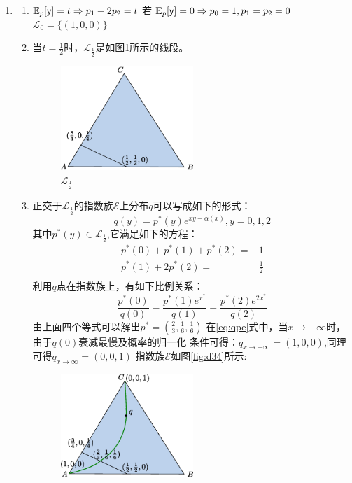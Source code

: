 \documentclass[a4paper]{article}
\begin{document}
\begin{enumerate}[label=\thehwcnt.\arabic*.]
\begin{enumerate}[label=(\alph*)]
   \end{enumerate}    
  \item 
  \begin{enumerate}[label=(\alph*)]
  \item $\operatorname{\mathbb{E}}_p[\mathsf{y}]=t \Rightarrow p_1+2p_2=t$
  若 $\operatorname{\mathbb{E}}_p[\mathsf{y}]=0 \Rightarrow p_0=1,p_1=p_2=0$
  $\mathcal{L}_0=\{(1,0,0)\}$
  \item 当$t=\frac{1}{2}$时，$\mathcal{L}_{\frac{1}{2}}$是如图\ref{fig:d12}所示的线段。
    \begin{figure}[!ht]
    \centering
    \includegraphics[width=5cm]{drawing.eps}
    \caption{$\mathcal{L}_{\frac{1}{2}}$}\label{fig:d12}
    \end{figure}
  \item 
  正交于$\mathcal{L}_{\frac{1}{2}}$的指数族$\mathcal{E}$上分布$q$可以写成如下的形式：
  \begin{equation}\label{eq:qpe}
        q(y)=p^*(y)e^{xy-\alpha(x)},y=0,1,2
  \end{equation}
  其中$p^*(y)\in \mathcal{L}_{\frac{1}{2}}$,它满足如下的方程：
  \begin{align}
   p^*(0)+p^*(1)+p^*(2)=& 1 \\
   p^*(1)+2p^*(2)=& \frac{1}{2} \\
  \end{align} 
  利用$q$点在指数族上，有如下比例关系：
  \[
   \frac{p^*(0)}{q(0)}=\frac{p^*(1)e^{x^*}}{q(1)}=\frac{p^*(2)e^{2x^*}}{q(2)}
  \]
  由上面四个等式可以解出$p^*=(\frac{2}{3},\frac{1}{6},\frac{1}{6})$
  在\eqref{eq:qpe}式中，当$x\to -\infty$时，由于$q(0)$衰减最慢及概率的归一化
  条件可得：$q_{x\to -\infty}=(1,0,0)$,同理可得$q_{x\to \infty}=(0,0,1)$
  指数族$\mathcal{E}$如图\ref{fig:d34}所示:
  \begin{figure}[!ht]
    \centering
    \includegraphics[width=5cm]{drawing2.eps}

\end{figure}
\end{enumerate}
\end{enumerate}
\end{document}
